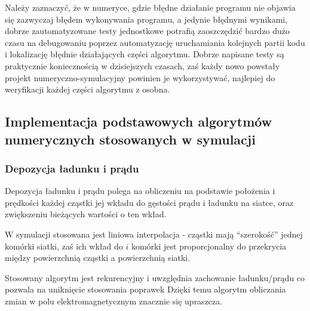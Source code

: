 
Należy zaznaczyć, że w numeryce, gdzie błędne działanie programu nie objawia się
zazwyczaj błędem wykonywania programu, a jedynie błędnymi wynikami, dobrze zautomatyzowane
testy jednostkowe potrafią zaoszczędzić bardzo dużo czasu na debugowaniu
poprzez automatyzację uruchamiania kolejnych partii kodu i lokalizację błędnie działających
części algorytmu. Dobrze napisane testy są praktycznie koniecznością w dzisiejszych
czasach, zaś każdy nowo powstały projekt numeryczno-symulacyjny powinien je
wykorzystywać, najlepiej do weryfikacji każdej części algorytmu z osobna.

\subsection{Implementacja podstawowych algorytmów numerycznych stosowanych w symulacji}
\subsubsection{Depozycja ładunku i prądu}

Depozycja ładunku i prądu polega na obliczeniu na podstawie położenia i prędkości każdej cząstki jej wkładu do
gęstości prądu i ładunku na siatce, oraz zwiększeniu bieżących wartości o ten wkład.

W symulacji stosowana jest liniowa interpolacja - cząstki mają ``szerokość'' jednej komórki siatki, zaś ich wkład do $i$
komórki jest proporcjonalny do przekrycia między powierzchnią cząstki a powierzchnią siatki.

Stosowany algorytm jest rekurencyjny i uwzględnia zachowanie ładunku/prądu %
co pozwala na uniknięcie stosowania poprawek %
Dzięki temu algorytm obliczania zmian w polu elektromagnetycznym znacznie się upraszcza.


